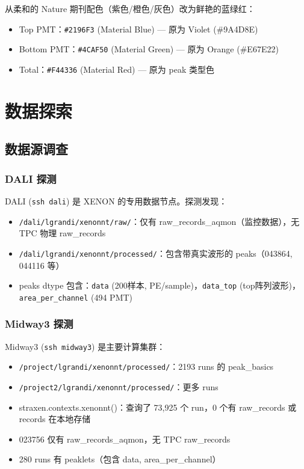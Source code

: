 \documentclass[12pt,a4paper]{article}
\begin{document}
从柔和的 Nature 期刊配色（紫色/橙色/灰色）改为鲜艳的蓝绿红：

\begin{itemize}[itemsep=2pt]
\item Top PMT：\texttt{\#2196F3} (Material Blue) — 原为 Violet (\#9A4D8E)
\item Bottom PMT：\texttt{\#4CAF50} (Material Green) — 原为 Orange (\#E67E22)
\item Total：\texttt{\#F44336} (Material Red) — 原为 peak 类型色
\end{itemize}

\section{数据探索}

\subsection{数据源调查}

\subsubsection{DALI 探测}

DALI (\texttt{ssh dali}) 是 XENON 的专用数据节点。探测发现：
\begin{itemize}[itemsep=2pt]
\item \texttt{/dali/lgrandi/xenonnt/raw/}：仅有 raw\_records\_aqmon（监控数据），无 TPC 物理 raw\_records
\item \texttt{/dali/lgrandi/xenonnt/processed/}：包含带真实波形的 peaks（043864, 044116 等）
\item peaks dtype 包含：\texttt{data} (200样本, PE/sample)，\texttt{data\_top} (top阵列波形)，\texttt{area\_per\_channel} (494 PMT)
\end{itemize}

\subsubsection{Midway3 探测}

Midway3 (\texttt{ssh midway3}) 是主要计算集群：
\begin{itemize}[itemsep=2pt]
\item \texttt{/project/lgrandi/xenonnt/processed/}：2193 runs 的 peak\_basics
\item \texttt{/project2/lgrandi/xenonnt/processed/}：更多 runs
\item straxen.contexts.xenonnt()：查询了 73,925 个 run，0 个有 raw\_records 或 records 在本地存储
\item 023756 仅有 raw\_records\_aqmon，无 TPC raw\_records
\item 280 runs 有 peaklets（包含 data, area\_per\_channel）
\end{itemize}
\end{document}

